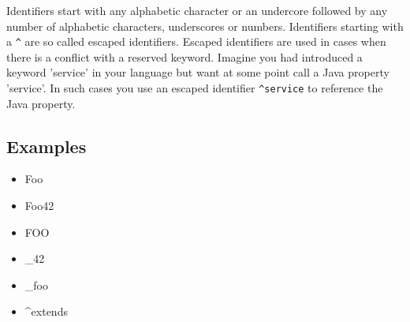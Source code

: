 \documentclass[a4paper,10pt]{scrreprt}
\newlength{\itemindentlen}
\begin{document}
Identifiers start with any alphabetic character or an undercore followed by any number of alphabetic characters, underscores or numbers. Identifiers starting with a \lstinline{^}
 are
so called escaped identifiers. Escaped identifiers are used in cases when there is a conflict with a reserved keyword. Imagine you had introduced
a keyword 'service' in your language but want at some point call a Java property 'service'. In such cases you use an escaped identifier \lstinline{^service}
 to reference the Java property.




\subsection{Examples}


\setlength{\itemindentlen}{\textwidth}
\begin{itemize}
\addtolength{\itemindentlen}{-2em}

\item \begin{minipage}[t]{\itemindentlen}
Foo
\end{minipage}

\item \begin{minipage}[t]{\itemindentlen}
Foo42
\end{minipage}

\item \begin{minipage}[t]{\itemindentlen}
FOO
\end{minipage}

\item \begin{minipage}[t]{\itemindentlen}
\_42
\end{minipage}

\item \begin{minipage}[t]{\itemindentlen}
\_foo
\end{minipage}

\item \begin{minipage}[t]{\itemindentlen}
\textasciicircum{}extends
\end{minipage}

\end{itemize}
\addtolength{\itemindentlen}{2em}
\end{document}
